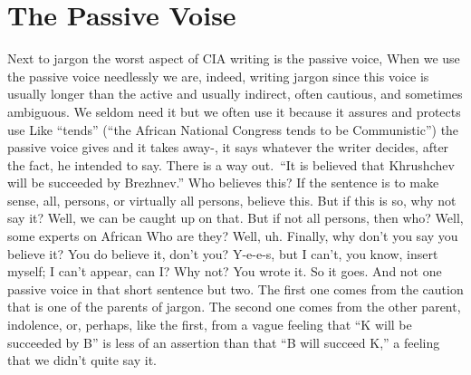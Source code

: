 \documentclass[
    oneside,
    11pt,
]{memoir}
\begin{document}
\chapter{The Passive Voise}

Next to jargon the worst aspect of CIA writing is the passive voice, When we use the passive voice needlessly we are, indeed, writing jargon since this voice is usually longer than the active and usually indirect, often cautious, and sometimes ambiguous. We seldom need it but we often use it because it assures and protects use Like \enquote{tends} (\enquote{the African National Congress tends to be Communistic}) the passive voice gives and it takes away-, it says whatever the writer decides, after the fact, he intended to say. There is a way out.\ \enquote{It is believed that Khrushchev will be succeeded by Brezhnev.} Who believes this? If the sentence is to make sense, all, persons, or virtually all persons, believe this. But if this is so, why not say it? Well, we can be caught up on that. But if not all persons, then who? Well, some experts on African Who are they? Well, uh. Finally, why don't you say you believe it? You do believe it, don't you? Y-e-e-s, but I can't, you know, insert myself; I can't appear, can I? Why not? You wrote it. So it goes. And not one passive voice in that short sentence but two. The first one comes from the caution that is one of the parents of jargon. The second one comes from the other parent, indolence, or, perhaps, like the first, from a vague feeling that \enquote{K will be succeeded by B} is less of an assertion than that \enquote{B will succeed K,} a feeling that we didn't quite say it.
\end{document}
